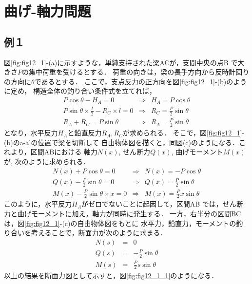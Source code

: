 \documentclass[10pt,a4j]{jbook}
\begin{document}
\section{曲げ-軸力問題}
\subsection{例１}
図\ref{fig:fig12_1}-(a)に示すような，単純支持された梁ACが，支間中央の点B
で大きさ$P$の集中荷重を受けるとする．
荷重の向きは，梁の長手方向から反時計回りの方向に$\theta$であるとする．
ここで，支点反力の正方向を図\ref{fig:fig12_1}-(b)のように定め，
構造全体の釣り合い条件式を立てれば，
\begin{eqnarray}
	P\cos\theta-H_A=0 & \Rightarrow & H_A=P\cos\theta \\
	P\sin\theta \times \frac{l}{2}-R_C\times l =0 & \Rightarrow & R_C=\frac{P}{2}\sin\theta \\
	R_A+R_C=P\sin\theta & \Rightarrow & R_A=\frac{P}{2}\sin\theta
\end{eqnarray}
となり，水平反力$H_A$と鉛直反力$R_A,R_C$が求められる．
そこで，図\ref{fig:fig12_1}-(b)のa-a'の位置で梁を切断して
自由物体図を描くと，同図(c)のようになる．これより，区間ABにおける
軸力$N(x)$, せん断力$Q(x)$, 曲げモーメント$M(x)$が, 次のように求められる．
\begin{eqnarray}
	N(x)+P\cos\theta=0 & \Rightarrow & N(x)=-P\cos\theta \\
	Q(x)-\frac{P}{2}\sin\theta=0 & \Rightarrow & Q(x)=\frac{P}{2}\sin\theta \\
	M(x)-\frac{P}{2}\sin\theta\times x =0 & \Rightarrow & M(x)=\frac{P}{2}x\sin\theta
\end{eqnarray}
このように，水平反力$H_A$がゼロでないことに起因して，区間AB
では，せん断力と曲げモーメントに加え，軸力が同時に発生する．
一方，右半分の区間BCは，図\ref{fig:fig12_1}-(c)の自由物体図をもとに
水平力，鉛直力，モーメントの釣り合いを考えることで，断面力が次のように求まる．
\begin{eqnarray}
	N(s)&=& 0 \\
	Q(s)&=&-\frac{P}{2}\sin\theta \\
	M(s)&=&\frac{P}{2}s \sin\theta
\end{eqnarray}
以上の結果を断面力図として示すと，図\ref{fig:fig12_1_1}のようになる．
\end{document}
